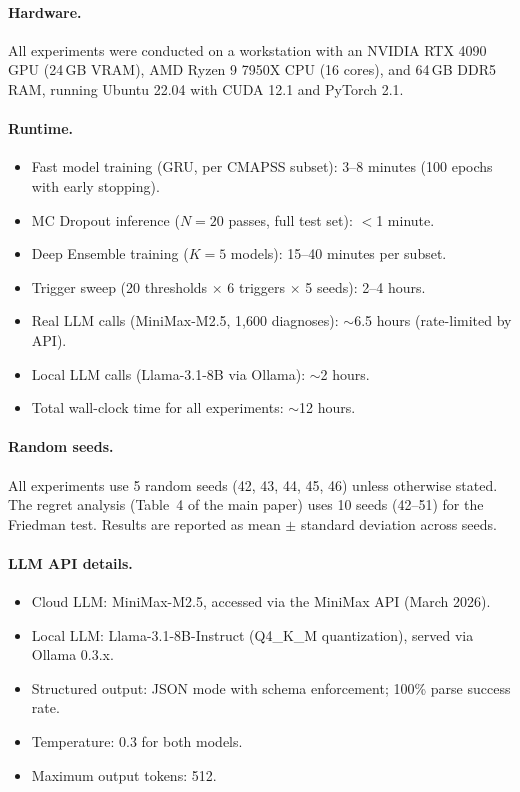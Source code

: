 \paragraph{Hardware.}
All experiments were conducted on a workstation with an NVIDIA RTX 4090 GPU (24\,GB VRAM), AMD Ryzen 9 7950X CPU (16 cores), and 64\,GB DDR5 RAM, running Ubuntu 22.04 with CUDA 12.1 and PyTorch 2.1.

\paragraph{Runtime.}
\begin{itemize}
\item Fast model training (GRU, per CMAPSS subset): 3--8 minutes (100 epochs with early stopping).
\item MC Dropout inference ($N{=}20$ passes, full test set): $<$1 minute.
\item Deep Ensemble training ($K{=}5$ models): 15--40 minutes per subset.
\item Trigger sweep (20 thresholds $\times$ 6 triggers $\times$ 5 seeds): 2--4 hours.
\item Real LLM calls (MiniMax-M2.5, 1{,}600 diagnoses): $\sim$6.5 hours (rate-limited by API).
\item Local LLM calls (Llama-3.1-8B via Ollama): $\sim$2 hours.
\item Total wall-clock time for all experiments: $\sim$12 hours.
\end{itemize}

\paragraph{Random seeds.}
All experiments use 5 random seeds (42, 43, 44, 45, 46) unless otherwise stated.
The regret analysis (Table~4 of the main paper) uses 10 seeds (42--51) for the Friedman test.
Results are reported as mean $\pm$ standard deviation across seeds.

\paragraph{LLM API details.}
\begin{itemize}
\item Cloud LLM: MiniMax-M2.5, accessed via the MiniMax API (March 2026).
\item Local LLM: Llama-3.1-8B-Instruct (Q4\_K\_M quantization), served via Ollama 0.3.x.
\item Structured output: JSON mode with schema enforcement; 100\% parse success rate.
\item Temperature: 0.3 for both models.
\item Maximum output tokens: 512.
\end{itemize}

